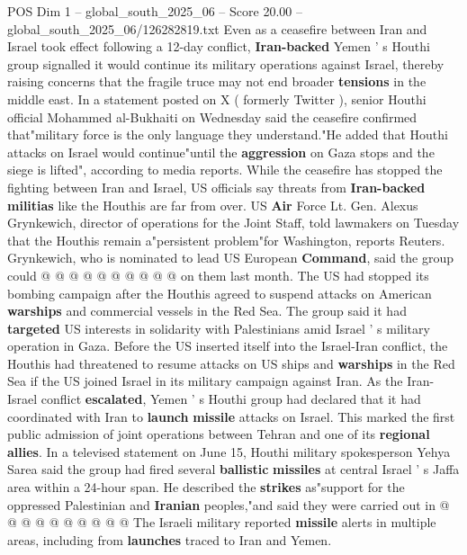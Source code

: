 \begin{textsample}{POS Dim 1 – global\_south\_2025\_06 – Score 20.00 – global\_south\_2025\_06/126282819.txt}  \label{ex:f1_pos_216}
Even as a ceasefire between Iran and Israel took effect following a 12-day conflict, \textbf{Iran-backed} Yemen ' s Houthi group signalled it would continue its military operations against Israel, thereby raising concerns that the fragile truce may not end broader \textbf{tensions} in the middle east.
In a statement posted on X ( formerly Twitter ), senior Houthi official Mohammed al-Bukhaiti on Wednesday said the ceasefire confirmed that"military force is the only language they understand."He added that Houthi attacks on Israel would continue"until the \textbf{aggression} on Gaza stops and the siege is lifted", according to media reports.
While the ceasefire has stopped the fighting between Iran and Israel, US officials say threats from \textbf{Iran-backed} \textbf{militias} like the Houthis are far from over.
US \textbf{Air} Force Lt.
Gen.
Alexus Grynkewich, director of operations for the Joint Staff, told lawmakers on Tuesday that the Houthis remain a"persistent problem"for Washington, reports Reuters.
Grynkewich, who is nominated to lead US European \textbf{Command}, said the group could @ @ @ @ @ @ @ @ @ @ on them last month.
The US had stopped its bombing campaign after the Houthis agreed to suspend attacks on American \textbf{warships} and commercial vessels in the Red Sea.
The group said it had \textbf{targeted} US interests in solidarity with Palestinians amid Israel ' s military operation in Gaza.
Before the US inserted itself into the Israel-Iran conflict, the Houthis had threatened to resume attacks on US ships and \textbf{warships} in the Red Sea if the US joined Israel in its military campaign against Iran.
As the Iran-Israel conflict \textbf{escalated}, Yemen ' s Houthi group had declared that it had coordinated with Iran to \textbf{launch} \textbf{missile} attacks on Israel.
This marked the first public admission of joint operations between Tehran and one of its \textbf{regional} \textbf{allies}.
In a televised statement on June 15, Houthi military spokesperson Yehya Sarea said the group had fired several \textbf{ballistic} \textbf{missiles} at central Israel ' s Jaffa area within a 24-hour span.
He described the \textbf{strikes} as"support for the oppressed Palestinian and \textbf{Iranian} peoples,"and said they were carried out in @ @ @ @ @ @ @ @ @ @ The Israeli military reported \textbf{missile} alerts in multiple areas, including from \textbf{launches} traced to Iran and Yemen.

\end{textsample}
